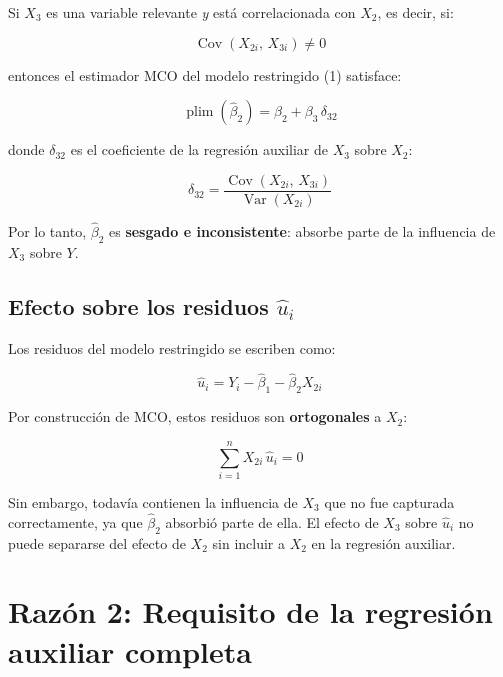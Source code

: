 \documentclass[12pt,letterpaper]{article}
\newcommand{\Var}{\operatorname{Var}}
\newcommand{\Cov}{\operatorname{Cov}}
\newcommand{\plim}{\operatorname{plim}}
\begin{document}
Si $X_{3}$ es una variable relevante \emph{y} está correlacionada
con $X_{2}$, es decir, si:

\begin{equation}
\Cov(X_{2i},\, X_{3i}) \neq 0
\end{equation}

entonces el estimador MCO del modelo restringido (1) satisface:

\begin{equation}
\plim(\hat{\beta}_{2})
= \beta_{2} + \beta_{3}\,\delta_{32}
\end{equation}

donde $\delta_{32}$ es el coeficiente de la regresión auxiliar de
$X_{3}$ sobre $X_{2}$:

\begin{equation}
\delta_{32}
= \frac{\Cov(X_{2i},\, X_{3i})}{\Var(X_{2i})}
\end{equation}

Por lo tanto, $\hat{\beta}_{2}$ es \textbf{sesgado e inconsistente}:
absorbe parte de la influencia de $X_{3}$ sobre $Y$.

\subsection{Efecto sobre los residuos $\hat{u}_{i}$}

Los residuos del modelo restringido se escriben como:

\begin{equation}
\hat{u}_{i}
= Y_{i} - \hat{\beta}_{1} - \hat{\beta}_{2} X_{2i}
\end{equation}

Por construcción de MCO, estos residuos son \textbf{ortogonales} a
$X_{2}$:

\begin{equation}
\sum_{i=1}^{n} X_{2i}\,\hat{u}_{i} = 0
\end{equation}

Sin embargo, todavía contienen la influencia de $X_{3}$ que no fue
capturada correctamente, ya que $\hat{\beta}_{2}$ absorbió parte de
ella. El efecto de $X_{3}$ sobre $\hat{u}_{i}$ no puede separarse
del efecto de $X_{2}$ sin incluir a $X_{2}$ en la regresión auxiliar.

\section{Razón 2: Requisito de la regresión auxiliar completa}
\end{document}
